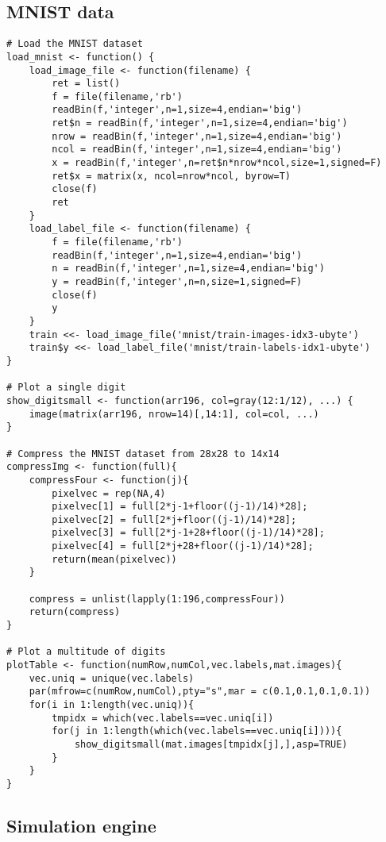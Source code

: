\subsection{MNIST data}
\label{sec:appendicies:al:simulations:data}
{
\begin{lstlisting}
# Load the MNIST dataset
load_mnist <- function() {
	load_image_file <- function(filename) {
		ret = list()
		f = file(filename,'rb')
		readBin(f,'integer',n=1,size=4,endian='big')
		ret$n = readBin(f,'integer',n=1,size=4,endian='big')
		nrow = readBin(f,'integer',n=1,size=4,endian='big')
		ncol = readBin(f,'integer',n=1,size=4,endian='big')
		x = readBin(f,'integer',n=ret$n*nrow*ncol,size=1,signed=F)
		ret$x = matrix(x, ncol=nrow*ncol, byrow=T)
		close(f)
		ret
	}
	load_label_file <- function(filename) {
		f = file(filename,'rb')
		readBin(f,'integer',n=1,size=4,endian='big')
		n = readBin(f,'integer',n=1,size=4,endian='big')
		y = readBin(f,'integer',n=n,size=1,signed=F)
		close(f)
		y
	}
	train <<- load_image_file('mnist/train-images-idx3-ubyte')	
	train$y <<- load_label_file('mnist/train-labels-idx1-ubyte')
}

# Plot a single digit
show_digitsmall <- function(arr196, col=gray(12:1/12), ...) {
	image(matrix(arr196, nrow=14)[,14:1], col=col, ...)
}

# Compress the MNIST dataset from 28x28 to 14x14
compressImg <- function(full){
	compressFour <- function(j){
		pixelvec = rep(NA,4)
		pixelvec[1] = full[2*j-1+floor((j-1)/14)*28];
		pixelvec[2] = full[2*j+floor((j-1)/14)*28];
		pixelvec[3] = full[2*j-1+28+floor((j-1)/14)*28];
		pixelvec[4] = full[2*j+28+floor((j-1)/14)*28];
		return(mean(pixelvec))
	}
	
	compress = unlist(lapply(1:196,compressFour))
	return(compress)
}

# Plot a multitude of digits
plotTable <- function(numRow,numCol,vec.labels,mat.images){
	vec.uniq = unique(vec.labels)
	par(mfrow=c(numRow,numCol),pty="s",mar = c(0.1,0.1,0.1,0.1))
	for(i in 1:length(vec.uniq)){
		tmpidx = which(vec.labels==vec.uniq[i])
		for(j in 1:length(which(vec.labels==vec.uniq[i]))){
			show_digitsmall(mat.images[tmpidx[j],],asp=TRUE)
		}
	}
}
\end{lstlisting}
}

\subsection{Simulation engine}
\label{sec:appendicies:al:simulations:simengine}

